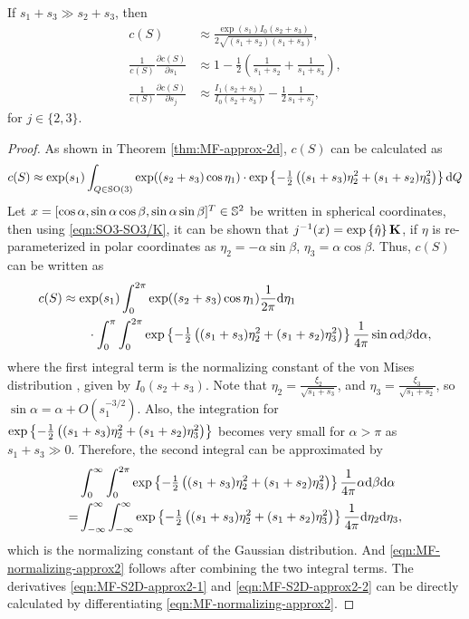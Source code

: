 \begin{corollary}
	If $s_1+s_3 \gg s_2+s_3$, then
	\begin{align}
		c(S) &\approx \frac{\exp(s_1)I_0(s_2+s_3)}{2\sqrt{(s_1+s_2)(s_1+s_3)}}, \label{eqn:MF-normalizing-approx2} \\
		\frac{1}{c(S)}\frac{\partial c(S)}{\partial s_1} &\approx 1 - \frac{1}{2}\left( \frac{1}{s_1+s_2} + \frac{1}{s_1+s_3} \right), \label{eqn:MF-S2D-approx2-1} \\
		\frac{1}{c(S)}\frac{\partial c(S)}{\partial s_j} &\approx \frac{I_1(s_2+s_3)}{I_0(s_2+s_3)} - \frac{1}{2}\frac{1}{s_1+s_j}, \label{eqn:MF-S2D-approx2-2}
	\end{align}
	for $j\in\{2,3\}$.
\end{corollary}
\begin{proof}
	As shown in Theorem \ref{thm:MF-approx-2d}, $c(S)$ can be calculated as
	\begin{align*}
		c(S) \approx \exp(s_1) \int_{Q\in\mathrm{SO}(3)} \exp((s_2+s_3)\cos\eta_1) \cdot \exp\left\{ -\tfrac{1}{2} \left( (s_1+s_3)\eta_2^2 + (s_1+s_2)\eta_3^2 \right) \right\} \mathrm{d} Q
	\end{align*}
	Let $x = [\cos\alpha, \sin\alpha\cos\beta, \sin\alpha\sin\beta]^T \in \mathbb{S}^2$ be written in spherical coordinates, then using \eqref{eqn:SO3-SO3/K}, it can be shown that $j^{-1}(x) = \exp\left\{ \hat{\eta} \right\} \mathbf{K}$, if $\eta$ is re-parameterized in polar coordinates as $\eta_2 = -\alpha\sin\beta$, $\eta_3 = \alpha\cos\beta$.
	Thus, $c(S)$ can be written as
	\begin{align*}
		c(S) &\approx \exp(s_1) \int_{0}^{2\pi} \exp((s_2+s_3)\cos\eta_1) \frac{1}{2\pi} \mathrm{d} \eta_1 \\
		&\qquad \cdot \int_{0}^\pi \int_{0}^{2\pi} \exp\left\{ -\tfrac{1}{2} \left( (s_1+s_3)\eta_2^2 + (s_1+s_2)\eta_3^2 \right) \right\} \frac{1}{4\pi} \sin\alpha \mathrm{d}\beta \mathrm{d}\alpha,
	\end{align*}
	where the first integral term is the normalizing constant of the von Mises distribution \cite[Chapter 3]{mardia2009directional}, given by $I_0(s_2+s_3)$.
	Note that $\eta_2 = \tfrac{\xi_2}{\sqrt{s_1+s_3}}$, and $\eta_3 = \tfrac{\xi_3}{\sqrt{s_1+s_2}}$, so $\sin\alpha = \alpha + O(s_1^{-3/2})$. Also, the integration for $\exp\left\{ -\tfrac{1}{2} \left( (s_1+s_3)\eta_2^2 + (s_1+s_2)\eta_3^2 \right) \right\}$ becomes very small for $\alpha > \pi$ as $s_1+s_3 \gg 0$.
	Therefore, the second integral can be approximated by
	\begin{align*}
		&\int_0^\infty \int_{0}^{2\pi} \exp\left\{ -\tfrac{1}{2} \left( (s_1+s_3)\eta_2^2 + (s_1+s_2)\eta_3^2 \right) \right\} \frac{1}{4\pi} \alpha \mathrm{d}\beta \mathrm{d}\alpha \\
		= &\int_{-\infty}^\infty \int_{-\infty}^\infty \exp\left\{ -\tfrac{1}{2} \left( (s_1+s_3)\eta_2^2 + (s_1+s_2)\eta_3^2 \right) \right\} \frac{1}{4\pi} \mathrm{d}\eta_2 \mathrm{d}\eta_3,
	\end{align*}
	which is the normalizing constant of the Gaussian distribution.
	And \eqref{eqn:MF-normalizing-approx2} follows after combining the two integral terms.
	The derivatives \eqref{eqn:MF-S2D-approx2-1} and \eqref{eqn:MF-S2D-approx2-2} can be directly calculated by differentiating \eqref{eqn:MF-normalizing-approx2}.
\end{proof}

